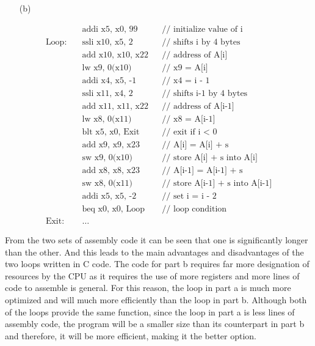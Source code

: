 \documentclass[12pt]{article}
\begin{document}
        \newpage
        \begin{itemize}
            \item[(b)]
        \end{itemize}
        \begin{align*}
                &\text{addi x5, x0, 99} &&\text{// initialize value of i} \\
            \text{Loop:}\quad
                &\text{ssli x10, x5, 2} &&\text{// shifts i by 4 bytes} \\
                &\text{add x10, x10, x22} &&\text{// address of A[i]} \\
                &\text{lw x9, 0(x10)} &&\text{// x9 = A[i]} \\
                &\text{addi x4, x5, -1} &&\text{// x4 = i - 1} \\
                &\text{ssli x11, x4, 2} &&\text{// shifts i-1 by 4 bytes} \\
                &\text{add x11, x11, x22} &&\text{// address of A[i-1]} \\
                &\text{lw x8, 0(x11)} &&\text{// x8 = A[i-1]} \\
                &\text{blt x5, x0, Exit} &&\text{// exit if i $<$ 0} \\
                &\text{add x9, x9, x23} &&\text{// A[i] = A[i] + s} \\
                &\text{sw x9, 0(x10)} &&\text{// store A[i] + s into A[i]} \\
                &\text{add x8, x8, x23} &&\text{// A[i-1] = A[i-1] + s} \\
                &\text{sw x8, 0(x11)} &&\text{// store A[i-1] + s into A[i-1]} \\
                &\text{addi x5, x5, -2} &&\text{// set i = i - 2} \\
                &\text{beq x0, x0, Loop} &&\text{// loop condition} \\
            \text{Exit:}\quad
                &\text{\ldots}
        \end{align*}
        \par From the two sets of assembly code it can be seen that one is
        significantly longer than the other. And this leads to the main
        advantages and disadvantages of the two loops written in C code. The
        code for part b requires far more designation of resources by the CPU as
        it requires the use of more registers and more lines of code to assemble
        is general. For this reason, the loop in part a is much more optimized
        and will much more efficiently than the loop in part b. Although both of
        the loops provide the same function, since the loop in part a is less
        lines of assembly code, the program will be a smaller size than its
        counterpart in part b and therefore, it will be more efficient, making
        it the better option.
\end{document}
